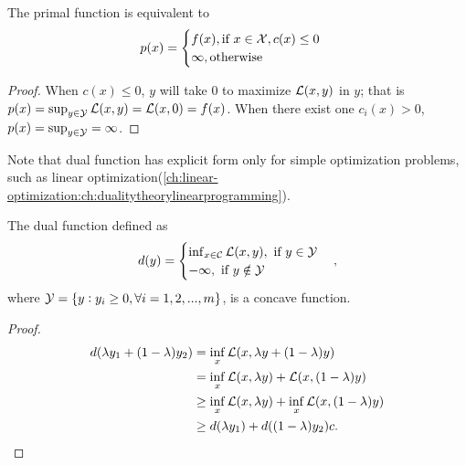 \begin{refsection}
\begin{lemma}
The primal function is equivalent to
$$p(x) = \begin{cases}
f(x),\text{if}~ x\in \mathcal{X}, c(x)\leq 0\\
\infty,\text{otherwise}
\end{cases}$$
\end{lemma}
\begin{proof}
When $c(x)\leq 0$, $y$ will take 0 to maximize $\mathcal{L}(x,y)$ in $y$; that is $p(x) = \sup_{y\in \mathcal{Y}} \mathcal{L}(x,y) = \mathcal{L}(x,0) = f(x)$. When there exist one $c_i(x) > 0$, $p(x) = \sup_{y\in \mathcal{Y}} = \infty$.
\end{proof}



\begin{remark}
Note that dual function has explicit form only for simple optimization problems, such as linear optimization(\autoref{ch:linear-optimization:ch:dualitytheorylinearprogramming}).
\end{remark}



\begin{lemma}
	 The dual function defined as
	$$d(y) = \begin{cases}
	\inf_{x\in \mathcal{C}} \mathcal{L}(x,y), ~\text{if}~ y\in \mathcal{Y}\\
	-\infty, ~\text{if}~ y\notin \mathcal{Y}
	\end{cases},$$
	where $\mathcal{Y} =\{y:y_i\geq 0, \forall i=1,2,...,m\}$, is a concave function.
\end{lemma}
\begin{proof}
\begin{align*}
d(\lambda y_1 + (1-\lambda)y_2) &= \inf_{x} \mathcal{L}(x,\lambda y + (1-\lambda)y) \\
&=\inf_{x} \mathcal{L}(x,\lambda y)+\mathcal{L}(x,(1-\lambda)y)\\
&\geq \inf_{x} \mathcal{L}(x,\lambda y) + \inf_{x}\mathcal{L}(x,(1-\lambda)y)\\
&\geq d(\lambda y_1) + d((1-\lambda) y_2)c.
\end{align*}
\end{proof}


\end{refsection}

